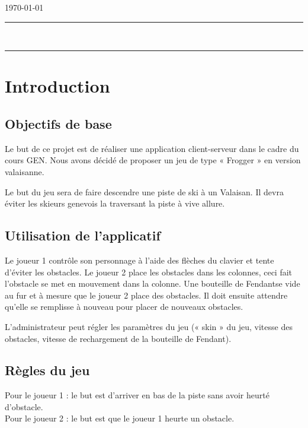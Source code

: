 \documentclass[a4paper,11pt]{article}
\author{\auteur}
\title{\titre}
\date{\today}
\begin{document}
	\thispagestyle{empty}
	\noindent \cours \hfill \ecole{} \newline
	\noindent \auteur \hfill \today \newline
	\hrule
	\vspace{7mm}
	\noindent {\large \bf \domaine } \hfill \titre {\large \bf }\\[3mm]
	\hrule

	\tableofcontents

	\newpage

	\section{Introduction}
	\subsection{Objectifs de base}
	Le but de ce projet est de réaliser une application client-serveur dans le cadre du cours GEN. Nous avons décidé de proposer un jeu de type « Frogger » en version valaisanne. \par

	Le but du jeu sera de faire descendre une piste de ski à un Valaisan. Il devra éviter les skieurs genevois la traversant la piste à vive allure.

	\subsection{Utilisation de l'applicatif}
	Le joueur 1 contrôle son personnage à l'aide des flèches du clavier et tente d'éviter les obstacles. Le joueur 2 place les obstacles dans les colonnes, ceci fait l'obstacle se met en mouvement dans la colonne. Une bouteille de Fendant\texttrademark se vide au fur et à mesure que le joueur 2 place des obstacles. Il doit ensuite attendre qu'elle se remplisse à nouveau pour placer de nouveaux obstacles.\par

	L'administrateur peut régler les paramètres du jeu (« skin » du jeu, vitesse des obstacles, vitesse de rechargement de la bouteille de Fendant\texttrademark).

	\subsection{Règles du jeu}
	Pour le joueur 1 : le but est d'arriver en bas de la piste sans avoir heurté d'obstacle. \\
	Pour le joueur 2 : le but est que le joueur 1 heurte un obstacle.
\end{document}
